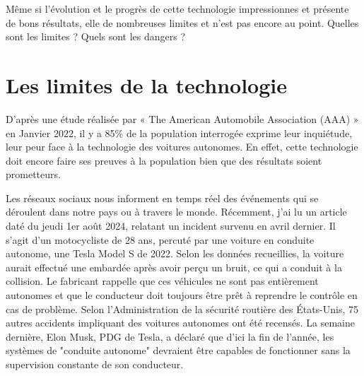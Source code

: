 \documentclass{article}
\begin{document}
Même si l'évolution et le progrès de cette technologie impressionnes et présente de bons résultats, elle de nombreuses limites et n'est pas encore au point. Quelles sont les limites ? Quels sont les dangers ?

\newpage
\section{Les limites de la technologie}



D'après une étude réalisée par « The American Automobile Association (AAA) »\cite{consumer_skepticim} en Janvier 2022, il y a 85\% de la population interrogée exprime leur inquiétude, leur peur face à la technologie des voitures autonomes. En effet, cette technologie doit encore faire ses preuves à la population bien que des résultats soient prometteurs.

Les réseaux sociaux nous informent en temps réel des événements qui se déroulent dans notre pays ou à travers le monde. 
Récemment, j'ai lu un article\cite{journal_de_quebec_motocycliste_nodate} daté du jeudi 1er août 2024, relatant un incident survenu en avril dernier. Il s'agit d'un motocycliste de 28 ans, percuté par une voiture en conduite autonome, une Tesla Model S de 2022. Selon les données recueillies, la voiture aurait effectué une embardée après avoir perçu un bruit, ce qui a conduit à la collision. Le fabricant rappelle que ces véhicules ne sont pas entièrement autonomes et que le conducteur doit toujours être prêt à reprendre le contrôle en cas de problème. Selon l'Administration de la sécurité routière des États-Unis, 75 autres accidents impliquant des voitures autonomes ont été recensés. 
La semaine dernière, Elon Musk, PDG de Tesla, a déclaré que d'ici la fin de l'année, les systèmes de "conduite autonome" devraient être capables de fonctionner sans la supervision constante de son conducteur.











\newpage
\printbibliography
\end{document}

